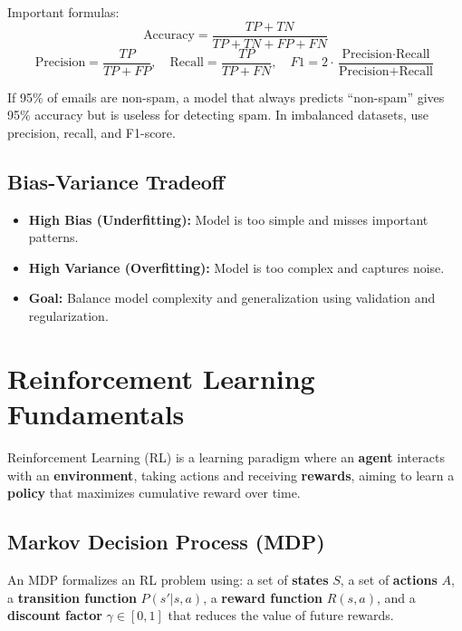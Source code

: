 \documentclass[11pt,a4paper]{article}
\begin{document}
Important formulas:
$$
\text{Accuracy}=\frac{TP+TN}{TP+TN+FP+FN}
$$
$$
\text{Precision}=\frac{TP}{TP+FP},\quad
\text{Recall}=\frac{TP}{TP+FN},\quad
F1=2\cdot\frac{\text{Precision}\cdot\text{Recall}}{\text{Precision}+\text{Recall}}
$$

\begin{conceptbox}
If 95\% of emails are non-spam, a model that always predicts ``non-spam'' gives 95\% accuracy but is useless for detecting spam. In imbalanced datasets, use precision, recall, and F1-score.
\end{conceptbox}

\subsection{Bias-Variance Tradeoff}
\begin{itemize}[leftmargin=*]
  \item \textbf{High Bias (Underfitting):} Model is too simple and misses important patterns.
  \item \textbf{High Variance (Overfitting):} Model is too complex and captures noise.
  \item \textbf{Goal:} Balance model complexity and generalization using validation and regularization.
\end{itemize}

\section{Reinforcement Learning Fundamentals}

\begin{definitionbox}
Reinforcement Learning (RL) is a learning paradigm where an \textbf{agent} interacts with an \textbf{environment}, taking actions and receiving \textbf{rewards}, aiming to learn a \textbf{policy} that maximizes cumulative reward over time.
\end{definitionbox}

\subsection{Markov Decision Process (MDP)}
\begin{conceptbox}[MDP]
An MDP formalizes an RL problem using: a set of \textbf{states} $S$, a set of \textbf{actions} $A$, a \textbf{transition function} $P(s'|s,a)$, a \textbf{reward function} $R(s,a)$, and a \textbf{discount factor} $\gamma \in [0,1]$ that reduces the value of future rewards.
\end{conceptbox}
\end{document}
